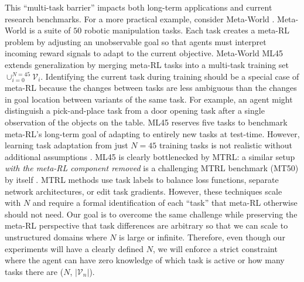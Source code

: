 This ``multi-task barrier'' impacts both long-term applications and current research benchmarks. For a more practical example, consider Meta-World \cite{yu2020meta}. Meta-World is a suite of $50$ robotic manipulation tasks. Each task creates a meta-RL problem by adjusting an unobservable goal so that agents must interpret incoming reward signals to adapt to the current objective. Meta-World ML45 extends generalization by merging meta-RL tasks into a multi-task training set $\cup_{i=0}^{N=45} \mathcal{V}_i$. Identifying the current task during training should be a special case of meta-RL because the changes between tasks are less ambiguous than the changes in goal location between variants of the same task. For example, an agent might distinguish a pick-and-place task from a door opening task after a single observation of the objects on the table. ML45 reserves five tasks to benchmark meta-RL's long-term goal of adapting to entirely new tasks at test-time. However, learning task adaptation from just $N=45$ training tasks is not realistic without additional assumptions \cite{yu2020meta, anand2022procedural}. ML45 is clearly bottlenecked by MTRL: a similar setup \textit{with the meta-RL component removed} is a challenging MTRL benchmark (MT50) by itself \cite{yu2020gradient, liu2021conflict}. MTRL methods use task labels to balance loss functions, separate network architectures, or edit task gradients. However, these techniques scale with $N$ and require a formal identification of each ``task'' that meta-RL otherwise should not need. Our goal is to overcome the same challenge while preserving the meta-RL perspective that task differences are arbitrary so that we can scale to unstructured domains where $N$ is large \cite{reed2022a} or infinite. Therefore, even though our experiments will have a clearly defined $N$, we will enforce a strict constraint where the agent can have zero knowledge of which task is active or how many tasks there are ($N$, $|\mathcal{V}_n|$).